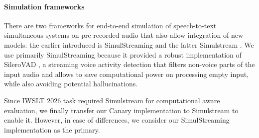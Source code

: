 \documentclass[11pt]{article}
\begin{document}
\paragraph{Simulation frameworks}
There are two frameworks for end-to-end simulation of speech-to-text simultaneous systems on pre-recorded audio that also allow integration of new models: the earlier introduced is SimulStreaming \cite{machacek-polak-2025-simultaneous} and the latter Simulstream \citep{gaido2025simulstream}. We use primarily SimulStreaming because it provided a robust implementation of SileroVAD \cite{Silero_VAD}, %
a streaming voice activity detection that filters non-voice parts of the input audio and allows to save computational power on processing empty input, while also avoiding potential hallucinations.

Since IWSLT 2026 task required Simulstream for computational aware evaluation, we finally transfer our Canary implementation to Simulstream to enable it. However, in case of differences, we consider our SimulStreaming implementation as the primary. %


\end{document}
